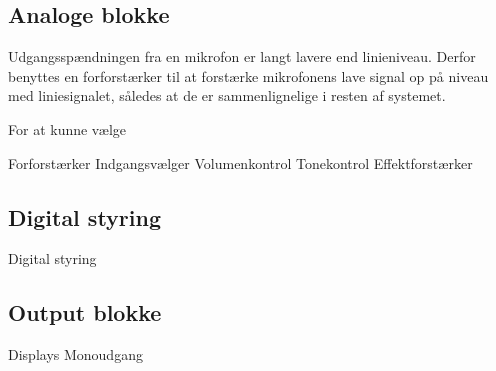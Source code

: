 \subsection*{Analoge blokke}

Udgangsspændningen fra en mikrofon er langt lavere end linieniveau. Derfor benyttes en forforstærker til at forstærke mikrofonens lave signal op på niveau med liniesignalet, således at de er sammenlignelige i resten af systemet.

For at kunne vælge 

Forforstærker
Indgangsvælger
Volumenkontrol
Tonekontrol
Effektforstærker

\subsection*{Digital styring}
Digital styring


\subsection*{Output blokke}
Displays
Monoudgang